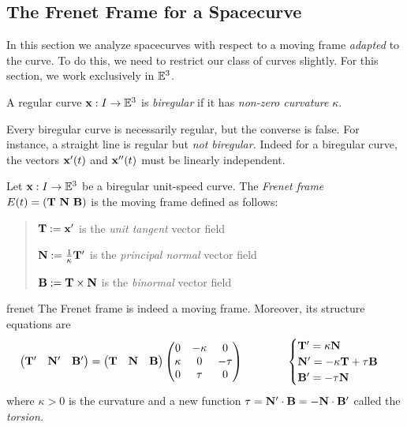 \clearpage



\subsection{The Frenet Frame for a Spacecurve}\label{sec:frenet}

In this section we analyze spacecurves with respect to a moving frame \emph{adapted} to the curve. To do this, we need to restrict our class of curves slightly. For this section, we work exclusively in $\mathbb{E}^3$.


\begin{defn}{}{}
A regular curve ${\mathbf{x}}:I\to\mathbb{E}^3$ is \emph{biregular} if it has \emph{non-zero curvature} $\kappa$.
\end{defn}

Every biregular curve is necessarily regular, but the converse is false. For instance, a straight line is regular but \emph{not biregular.} Indeed for a biregular curve, the vectors ${\mathbf{x}}'(t)$ and ${\mathbf{x}}''(t)$ must be linearly independent.

\begin{defn}{}{}
Let ${\mathbf{x}}:I\to\mathbb{E}^3$ be a biregular unit-speed curve. The \emph{Frenet frame} $E(t)=({\mathbf{T}}\ {\mathbf{N}}\ {\mathbf{B}})$ is the moving frame defined as follows:
\begin{quote}
	${\mathbf{T}}:={\mathbf{x}}'$ is the \emph{unit tangent} vector field\par
	${\mathbf{N}}:=\frac 1{\kappa}{\mathbf{T}}'$ is the \emph{principal normal} vector field\par
	${\mathbf{B}}:={\mathbf{T}}\times{\mathbf{N}}$ is the \emph{binormal} vector field
\end{quote}
\end{defn}


\begin{thm}{}{frenet}
The Frenet frame is indeed a moving frame. Moreover, its structure equations are
\[\begin{pmatrix}
		{\mathbf{T}}'&{\mathbf{N}}'&{\mathbf{B}}'
  \end{pmatrix}
  =
  \begin{pmatrix}
  	{\mathbf{T}}&{\mathbf{N}}&{\mathbf{B}}
  \end{pmatrix}
  \begin{pmatrix}
		0&-\kappa&0\\
		\kappa&0&-\tau\\
		0&\tau&0
	\end{pmatrix}
	\qquad\qquad 
	\begin{cases}
		{\mathbf{T}}'=\kappa{\mathbf{N}}\\
		{\mathbf{N}}'=-\kappa{\mathbf{T}}+\tau{\mathbf{B}}\\
		{\mathbf{B}}'=-\tau{\mathbf{N}}
	\end{cases}
  \]
where $\kappa>0$ is the curvature and a new function $\tau={\mathbf{N}}'\cdot{\mathbf{B}}=-{\mathbf{N}}\cdot{\mathbf{B}}'$ called the \emph{torsion.}
\end{thm}


